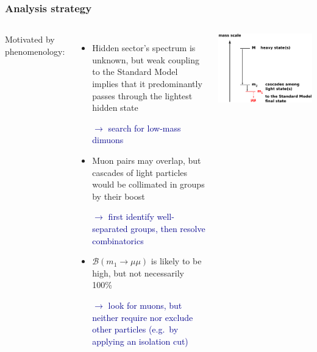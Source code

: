 \documentclass[compress]{beamer}
\begin{document}
\begin{frame}
\frametitle{Analysis strategy}
\begin{columns}
Motivated by phenomenology:
\begin{itemize}
\item Hidden sector's spectrum is unknown, but weak coupling to
  the Standard Model implies that it predominantly passes through the lightest
  hidden state

\textcolor{darkblue}{$\longrightarrow$ search for low-mass dimuons}

\item Muon pairs may overlap, but cascades of light particles would
  be collimated in groups by their boost

\textcolor{darkblue}{$\longrightarrow$ first identify well-separated groups, then
  resolve combinatorics}

\item $\mathcal{B}(m_1 \to \mu\mu)$ is likely to be high, but not
  necessarily 100\%

\textcolor{darkblue}{$\longrightarrow$ look for muons, but neither
  require nor exclude other particles (e.g.\ by applying an isolation cut)}
\end{itemize}

\includegraphics[width=\linewidth]{basic_picture4.pdf}


\end{columns}
\end{frame}
\end{document}

